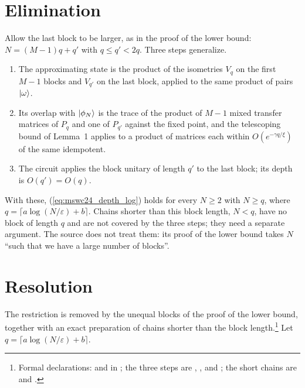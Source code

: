 \documentclass{article}
\begin{document}
\section{Elimination}
Allow the last block to be larger, as in the proof of the lower bound: $N=(M-1)q+q'$ with
$q\leq q'<2q$. Three steps generalize.
\begin{enumerate}
    \item The approximating state is the product of the isometries $V_q$ on the
          first $M-1$ blocks and $V_{q'}$ on the last block, applied to the same
          product of pairs $|\omega\rangle$.
    \item Its overlap with $|\phi_N\rangle$ is the trace of the product of $M-1$
          mixed transfer matrices of $P_q$ and one of $P_{q'}$ against the fixed
          point, and the telescoping bound of Lemma~1 applies to a product of
          matrices each within $O(e^{-\gamma q/\xi})$ of the same idempotent.
    \item The circuit applies the block unitary of length $q'$ to the last block;
          its depth is $O(q')=O(q)$.
\end{enumerate}
With these, (\ref{eq:mswc24_depth_log}) holds for every $N\geq2$ with
$N\geq q$, where $q=\lceil a\log(N/\varepsilon)+b\rceil$. Chains shorter
than this block length, $N<q$, have no block of length $q$ and are not covered
by the three steps; they need a separate argument. The source does not treat
them: its proof of the lower bound takes $N$ ``such that we have a large number
of blocks''.

\section{Resolution}
The restriction is removed by the unequal blocks of the proof of the lower
bound, together with an exact preparation of chains shorter than the block
length.\footnote{Formal declarations:
    and  in
    ; the three steps are
    ,
    , and
    ; the
    short chains are
     and
    .}
Let $q=\lceil a\log(N/\varepsilon)+b\rceil$.
\end{document}
